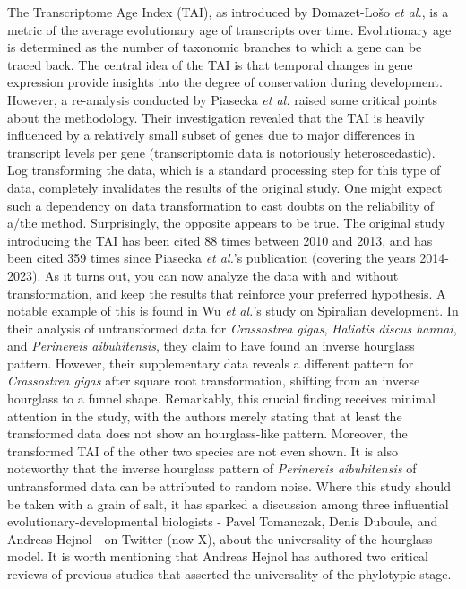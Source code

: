 The Transcriptome Age Index (TAI), as introduced by Domazet-Lošo \textit{et al.}, is a metric of the average evolutionary age of transcripts over time\cite{DomazetLoso2010}. Evolutionary age is determined as the number of taxonomic branches to which a gene can be traced back. The central idea of the TAI is that temporal changes in gene expression provide insights into the degree of conservation during development. However, a re-analysis conducted by Piasecka \textit{et al.} raised some critical points about the methodology\cite{Piasecka2013}. Their investigation revealed that the TAI is heavily influenced by a relatively small subset of genes due to major differences in transcript levels per gene (transcriptomic data is notoriously heteroscedastic). Log transforming the data, which is a standard processing step for this type of data, completely invalidates the results of the original study. One might expect such a dependency on data transformation to cast doubts on the reliability of a/the method. Surprisingly, the opposite appears to be true. The original study introducing the TAI has been cited 88 times between 2010 and 2013, and has been cited 359 times since Piasecka \textit{et al.}'s publication (covering the years 2014-2023). As it turns out, you can now analyze the data with and without transformation, and keep the results that reinforce your preferred hypothesis. A notable example of this is found in Wu \textit{et al.}'s study on Spiralian development\cite{Wu2019}. In their analysis of untransformed data for \textit{Crassostrea gigas}, \textit{Haliotis discus hannai}, and \textit{Perinereis aibuhitensis}, they claim to have found an inverse hourglass pattern. However, their supplementary data reveals a different pattern for \textit{Crassostrea gigas} after square root transformation, shifting from an inverse hourglass to a funnel shape. Remarkably, this crucial finding receives minimal attention in the study, with the authors merely stating that at least the transformed data does not show an hourglass-like pattern. Moreover, the transformed TAI of the other two species are not even shown. It is also noteworthy that the inverse hourglass pattern of \textit{Perinereis aibuhitensis} of untransformed data can be attributed to random noise. Where this study should be taken with a grain of salt, it has sparked a discussion among three influential evolutionary-developmental biologists - Pavel Tomanczak, Denis Duboule, and Andreas Hejnol - on Twitter (now X), about the universality of the hourglass model. It is worth mentioning that Andreas Hejnol has authored two critical reviews of previous studies that asserted the universality of the phylotypic stage\cite{Dunn2018,hejnol2016}.

